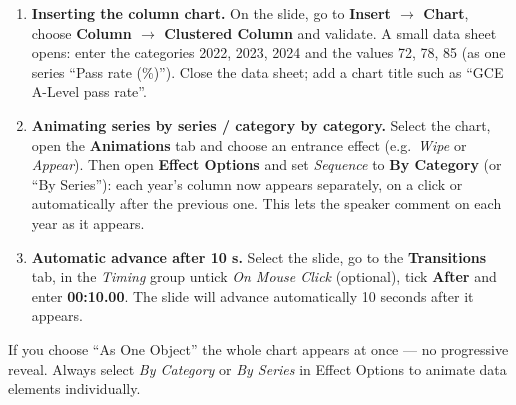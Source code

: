 \documentclass[11pt]{article}
\begin{document}
\begin{corrige}
\begin{enumerate}
\item \textbf{Inserting the column chart.} On the slide, go to \textbf{Insert $\rightarrow$ Chart}, choose \textbf{Column $\rightarrow$ Clustered Column} and validate. A small data sheet opens: enter the categories 2022, 2023, 2024 and the values 72, 78, 85 (as one series ``Pass rate (\%)''). Close the data sheet; add a chart title such as ``GCE A-Level pass rate''.
\item \textbf{Animating series by series / category by category.} Select the chart, open the \textbf{Animations} tab and choose an entrance effect (e.g.\ \emph{Wipe} or \emph{Appear}). Then open \textbf{Effect Options} and set \emph{Sequence} to \textbf{By Category} (or ``By Series''): each year's column now appears separately, on a click or automatically after the previous one. This lets the speaker comment on each year as it appears.
\item \textbf{Automatic advance after 10 s.} Select the slide, go to the \textbf{Transitions} tab, in the \emph{Timing} group untick \emph{On Mouse Click} (optional), tick \textbf{After} and enter \textbf{00:10.00}. The slide will advance automatically 10 seconds after it appears.
\end{enumerate}
\begin{attention}
If you choose ``As One Object'' the whole chart appears at once — no progressive reveal. Always select \emph{By Category} or \emph{By Series} in Effect Options to animate data elements individually.
\end{attention}
\end{corrige}
\end{document}
